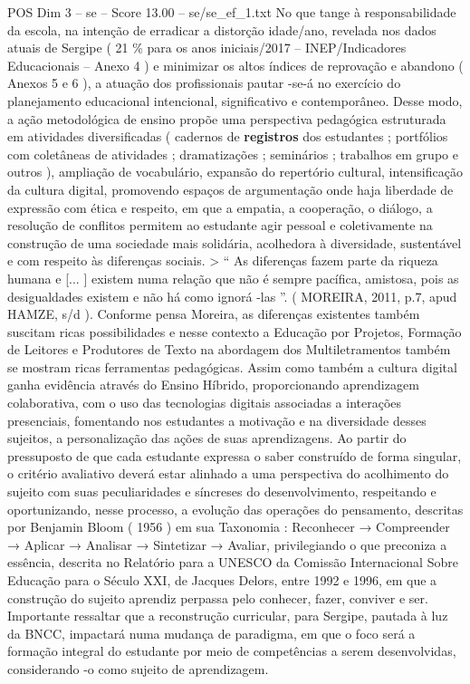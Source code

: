 \begin{textsample}{POS Dim 3 – se – Score 13.00 – se/se\_ef\_1.txt}
No que tange à responsabilidade da escola, na intenção de erradicar a distorção idade/ano, revelada nos dados atuais de Sergipe ( 21 \% para os anos iniciais/2017 – INEP/Indicadores Educacionais – Anexo 4 ) e minimizar os altos índices de reprovação e abandono ( Anexos 5 e 6 ), a atuação dos profissionais pautar -se-á no exercício do planejamento educacional intencional, significativo e contemporâneo.
Desse modo, a ação metodológica de ensino propõe uma perspectiva pedagógica estruturada em atividades diversificadas ( cadernos de \textbf{registros} dos estudantes ; portfólios com coletâneas de atividades ; dramatizações ; seminários ; trabalhos em grupo e outros ), ampliação de vocabulário, expansão do repertório cultural, intensificação da cultura digital, promovendo espaços de argumentação onde haja liberdade de expressão com ética e respeito, em que a empatia, a cooperação, o diálogo, a resolução de conflitos permitem ao estudante agir pessoal e coletivamente na construção de uma sociedade mais solidária, acolhedora à diversidade, sustentável e com respeito às diferenças sociais. > “ As diferenças fazem parte da riqueza humana e [... ] existem numa relação que não é sempre pacífica, amistosa, pois as desigualdades existem e não há como ignorá -las ”. ( MOREIRA, 2011, p.7, apud HAMZE, s/d ).
Conforme pensa Moreira, as diferenças existentes também suscitam ricas possibilidades e nesse contexto a Educação por Projetos, Formação de Leitores e Produtores de Texto na abordagem dos Multiletramentos também se mostram ricas ferramentas pedagógicas.
Assim como também a cultura digital ganha evidência através do Ensino Híbrido, proporcionando aprendizagem colaborativa, com o uso das tecnologias digitais associadas a interações presenciais, fomentando nos estudantes a motivação e na diversidade desses sujeitos, a personalização das ações de suas aprendizagens.
Ao partir do pressuposto de que cada estudante expressa o saber construído de forma singular, o critério avaliativo deverá estar alinhado a uma perspectiva do acolhimento do sujeito com suas peculiaridades e síncreses do desenvolvimento, respeitando e oportunizando, nesse processo, a evolução das operações do pensamento, descritas por Benjamin Bloom ( 1956 ) em sua Taxonomia : Reconhecer → Compreender → Aplicar → Analisar → Sintetizar → Avaliar, privilegiando o que preconiza a essência, descrita no Relatório para a UNESCO da Comissão Internacional Sobre Educação para o Século XXI, de Jacques Delors, entre 1992 e 1996, em que a construção do sujeito aprendiz perpassa pelo conhecer, fazer, conviver e ser.
Importante ressaltar que a reconstrução curricular, para Sergipe, pautada à luz da BNCC, impactará numa mudança de paradigma, em que o foco será a formação integral do estudante por meio de competências a serem desenvolvidas, considerando -o como sujeito de aprendizagem.

\end{textsample}
